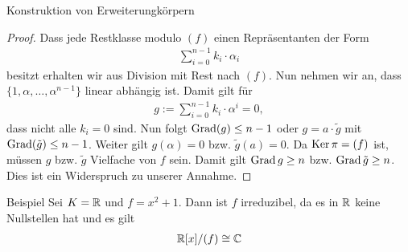 \begin{genericdf}{Konstruktion von Erweiterungkörpern}
	\begin{proof}
		Dass jede Restklasse modulo $ (f) $ einen Repräsentanten der Form
		\begin{align*}
		\sum \limits_{i=0}^{n-1} k_i \cdot \alpha_i
		\end{align*}
		besitzt erhalten wir aus Division mit Rest nach $ (f) $.
		Nun nehmen wir an, dass 
		$ \lbrace 1 , \alpha , \dots , \alpha^{n-1} \rbrace $
		linear abhängig ist.
		Damit gilt für
		\begin{align*}
		g:= \sum \limits_{i= 0}^{n-1} k_i \cdot \alpha^i = 0,
		\end{align*}
		dass nicht alle $ k_i = 0  $ sind.
		Nun folgt $ \operatorname{Grad}(g) \leq n-1 $ oder $ g = a \cdot \tilde{g} $ mit $ \operatorname{Grad}(\tilde{g}) \leq n -1 $.
		Weiter gilt $ g(\alpha) = 0 $ bzw. $ \tilde{g}(a) = 0 $.
		Da $ \operatorname{Ker} \pi  = (f)$ ist, müssen $ g $ bzw. $ \tilde{g} $ Vielfache von $ f $ sein.
		Damit gilt $ \operatorname{Grad} g \geq n $ bzw. $ \operatorname{Grad} \tilde{g} \geq n $.
		Dies ist ein Widerspruch zu unserer Annahme.
	\end{proof}
\end{genericdf}

\begin{genericdf}{Beispiel}\label{skript:9.11}
	Sei $ K = \mathbb{R} $ und $ f = x^2 + 1 $.
	Dann ist $ f $ irreduzibel, da es in $ \mathbb{R} $ keine Nullstellen hat und es gilt
	\begin{align*}
	\mathbb{R}[x] / (f) \cong \mathbb{C}
	\end{align*}
\end{genericdf}